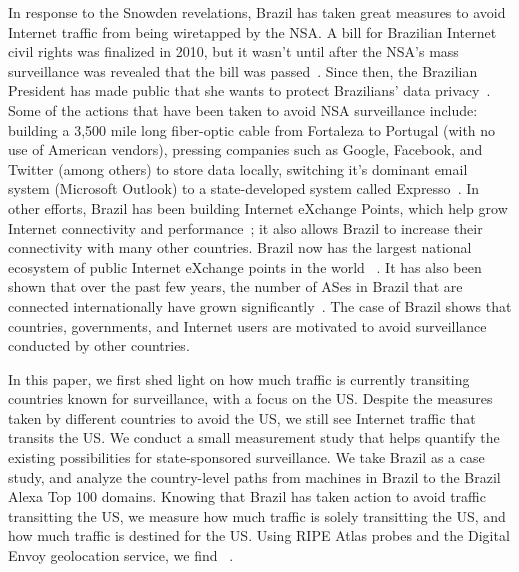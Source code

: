 In response to the Snowden revelations, Brazil has taken great measures to avoid Internet traffic from being wiretapped by the NSA.  A bill for Brazilian Internet civil rights was finalized in 2010, but it wasn't until after the NSA's mass surveillance was revealed that the bill was passed~\cite{brazil_history}.  Since then, the Brazilian President has made public that she wants to protect Brazilians' data privacy~\cite{brazil_break_from_US, brazil_conference, brazil_conference2, brazil_human_rights}.  Some of the actions that have been taken to avoid NSA surveillance include: building a 3,500 mile long fiber-optic cable from Fortaleza to Portugal (with no use of American vendors), pressing companies such as Google, Facebook, and Twitter (among others) to store data locally, switching it's dominant email system (Microsoft Outlook) to a state-developed system called Expresso~\cite{brazil_cable, brazil_us_companies}.  In other efforts, Brazil has been building Internet eXchange Points, which help grow Internet connectivity and performance~\cite{brazil_IXP1, brazil_IXP2}; it also allows Brazil to increase their connectivity with many other countries.  Brazil now has the largest national ecosystem of public Internet eXchange points in the world ~\cite{brazil_largest_IXP}.  It has also been shown that over the past few years, the number of ASes in Brazil that are connected internationally have grown significantly~\cite{brazil_international_ases}.  The case of Brazil shows that countries, governments, and Internet users are motivated to avoid surveillance conducted by other countries.

In this paper, we first shed light on how much traffic is currently transiting countries known for surveillance, with a focus on the US.  Despite the measures taken by different countries to avoid the US, we still see Internet traffic that transits the US.  We conduct a small measurement study that helps quantify the existing possibilities for state-sponsored surveillance.  We take Brazil as a case study, and analyze the country-level paths from machines in Brazil to the Brazil Alexa Top 100 domains.  Knowing that Brazil has taken action to avoid traffic transitting the US, we measure how much traffic is solely transitting the US, and how much traffic is destined for the US.  Using RIPE Atlas probes and the Digital Envoy geolocation service, we find ~\cite{ripe_atlas, digital_envoy}.  

